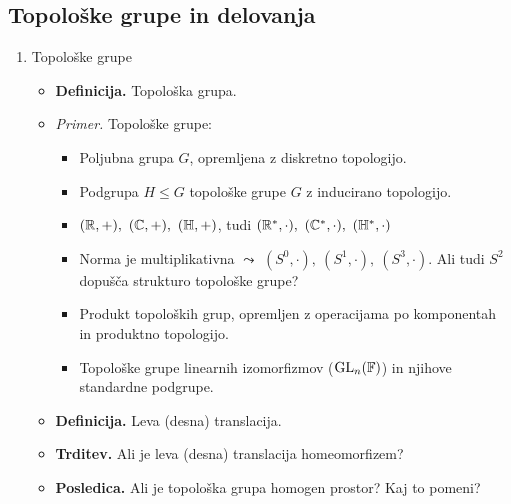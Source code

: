\subsection{Topološke grupe in delovanja}
\begin{enumerate}
    \item Topološke grupe
    \begin{itemize}
        \item \colorbox{purple!30}{\textbf{Definicija.}} Topološka grupa.
        \item \colorbox{yellow!30}{\emph{Primer.}} Topološke grupe:
        \begin{itemize}
            \item Poljubna grupa \(G\), opremljena z diskretno topologijo.
            \item Podgrupa \(H \leq G\) topološke grupe \(G\) z inducirano topologijo.
            \item \((\mathbb{R}, +), \ (\mathbb{C}, +), \ (\mathbb{H}, +)\), tudi \((\mathbb{R}^*, \cdot), \ (\mathbb{C}^*, \cdot), \ (\mathbb{H}^*, \cdot)\)
            \item Norma je multiplikativna \(\leadsto\) \((S^0, \cdot), \ (S^1, \cdot), \ (S^3, \cdot)\). Ali tudi \(S^2\) dopušča strukturo topološke grupe?
            \item Produkt topoloških grup, opremljen z operacijama po komponentah in produktno topologijo.
            \item Topološke grupe linearnih izomorfizmov (\(\operatorname{GL}_n(\mathbb{F})\)) in njihove standardne podgrupe.
        \end{itemize}
        \item \colorbox{purple!30}{\textbf{Definicija.}} Leva (desna) translacija.
        \item \colorbox{blue!30}{\textbf{Trditev.}} Ali je leva (desna) translacija homeomorfizem?
        \item \colorbox{orange!30}{\textbf{Posledica.}} Ali je topološka grupa homogen prostor? Kaj to pomeni?
    \end{itemize}


\end{enumerate}
